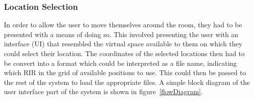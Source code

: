\documentclass[../../main.tex]{subfiles}
\begin{document}
		\subsubsection{Location Selection}
		\label{locationSelection}

			In order to allow the user to move themselves around the room, they had to be presented with a means of doing so. This involved presenting the user with an interface (UI) that resembled the virtual space available to them on which they could select their location. The coordinates of the selected locations then had to be convert into a format which could be interpreted as a file name, indicating which \ac{RIR} in the grid of available positions to use. This could then be passed to the rest of the system to load the appropriate files. A simple block diagram of the user interface part of the system is shown in figure~\ref{flowDiagram}.
\end{document}
